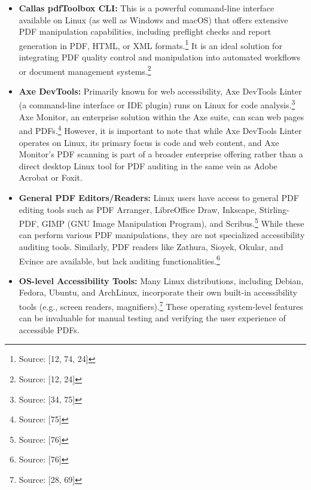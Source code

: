 \begin{itemize}[noitemsep,topsep=0pt]
    \item \textbf{Callas pdfToolbox CLI:} This is a powerful command-line interface available on Linux (as well as Windows and macOS) that offers extensive PDF manipulation capabilities, including preflight checks and report generation in PDF, HTML, or XML formats.\footnote{Source: [12, 74, 24]} It is an ideal solution for integrating PDF quality control and manipulation into automated workflows or document management systems.\footnote{Source: [12, 24]}
    \item \textbf{Axe DevTools:} Primarily known for web accessibility, Axe DevTools Linter (a command-line interface or IDE plugin) runs on Linux for code analysis.\footnote{Source: [34, 75]} Axe Monitor, an enterprise solution within the Axe suite, can scan web pages and PDFs.\footnote{Source: [75]} However, it is important to note that while Axe DevTools Linter operates on Linux, its primary focus is code and web content, and Axe Monitor's PDF scanning is part of a broader enterprise offering rather than a direct desktop Linux tool for PDF auditing in the same vein as Adobe Acrobat or Foxit.
    \item \textbf{General PDF Editors/Readers:} Linux users have access to general PDF editing tools such as PDF Arranger, LibreOffice Draw, Inkscape, Stirling-PDF, GIMP (GNU Image Manipulation Program), and Scribus.\footnote{Source: [76]} While these can perform various PDF manipulations, they are not specialized accessibility auditing tools. Similarly, PDF readers like Zathura, Sioyek, Okular, and Evince are available, but lack auditing functionalities.\footnote{Source: [76]}
    \item \textbf{OS-level Accessibility Tools:} Many Linux distributions, including Debian, Fedora, Ubuntu, and ArchLinux, incorporate their own built-in accessibility tools (e.g., screen readers, magnifiers).\footnote{Source: [28, 69]} These operating system-level features can be invaluable for manual testing and verifying the user experience of accessible PDFs.
\end{itemize}


